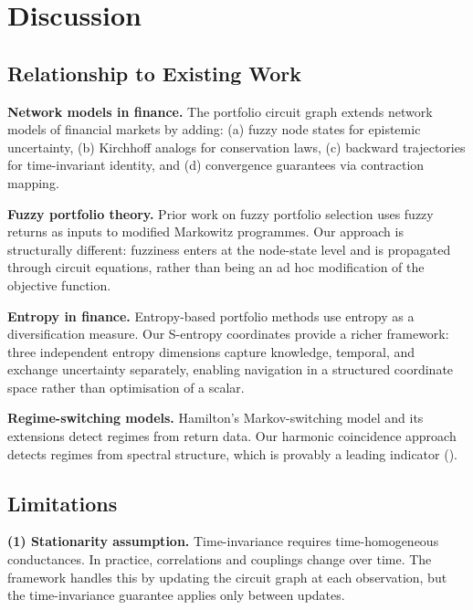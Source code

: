 \documentclass[twocolumn,10pt]{article}
\theoremstyle{remark}
\begin{document}
\section{Discussion}
\label{sec:discussion}

\subsection{Relationship to Existing Work}

\textbf{Network models in finance.}  The portfolio circuit graph extends network models of financial markets \cite{mantegna1999,tumminello2005,pozzi2013,diebold2014,acemoglu2015,battiston2012,elliott2014,gai2010} by adding: (a) fuzzy node states for epistemic uncertainty, (b) Kirchhoff analogs for conservation laws, (c) backward trajectories for time-invariant identity, and (d) convergence guarantees via contraction mapping.

\textbf{Fuzzy portfolio theory.}  Prior work on fuzzy portfolio selection \cite{tanaka1982,carlsson2002,watada1997,huang2006} uses fuzzy returns as inputs to modified Markowitz programmes.  Our approach is structurally different: fuzziness enters at the node-state level and is propagated through circuit equations, rather than being an ad hoc modification of the objective function.

\textbf{Entropy in finance.}  Entropy-based portfolio methods \cite{philippatos1972,bera2008,zhou2013} use entropy as a diversification measure.  Our S-entropy coordinates provide a richer framework: three independent entropy dimensions capture knowledge, temporal, and exchange uncertainty separately, enabling navigation in a structured coordinate space rather than optimisation of a scalar.

\textbf{Regime-switching models.}  Hamilton's Markov-switching model \cite{hamilton1989} and its extensions \cite{ang2002} detect regimes from return data.  Our harmonic coincidence approach detects regimes from spectral structure, which is provably a leading indicator ().

\subsection{Limitations}

\textbf{(1) Stationarity assumption.}  Time-invariance requires time-homogeneous conductances.  In practice, correlations and couplings change over time.  The framework handles this by updating the circuit graph at each observation, but the time-invariance guarantee applies only between updates.
\end{document}
